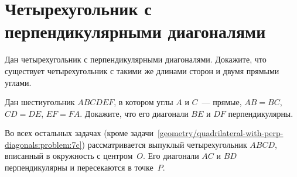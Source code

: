 
\section*{Четырехугольник с перпендикулярными диагоналями}



\begin{problems}

\item
Дан четырехугольник с перпендикулярными диагоналями.
Докажите, что существует четырехугольник с такими же длинами сторон и двумя
прямыми углами.

\item
Дан шестиугольник $ABCDEF$, в котором углы $A$ и $C$~--- прямые,
$AB = BC$, $CD = DE$, $EF = FA$.
Докажите, что его диагонали $BE$ и $DF$ перпендикулярны.

\end{problems}

Во всех остальных задачах
(кроме задачи~\ref{geometry/quadrilateral-with-perp-diagonals:problem:7c})
рассматривается выпуклый четырехугольник $ABCD$, вписанный в окружность
с центром~$O$.
Его диагонали $AC$ и $BD$ перпендикулярны и пересекаются в точке~$P$.

